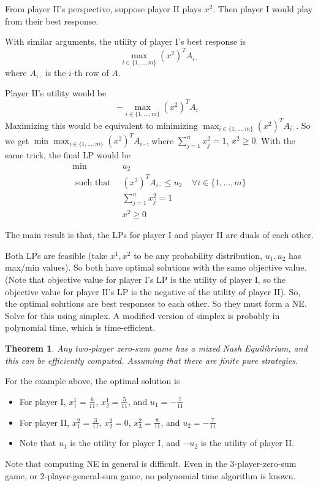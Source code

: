 \documentclass[twoside]{article}
\newcounter{lecnum}
\newtheorem{prototheorem}{Theorem}[lecnum]
\newenvironment{theorem}
{\colorlet{shadecolor}{orange!15}\begin{shaded}\begin{prototheorem}\normalfont}
		{\end{prototheorem}\end{shaded}}
\begin{document}
From player II's perspective, suppose player II plays $x^2$. Then player I would play from their best response. 

With similar arguments, the utility of player I's best response is $$\max_{i \in \{1, ..., m\}} (x^2)^TA_{i\cdot}$$ where $A_{i\cdot }$ is the $i$-th row of $A$. 

Player II's utility would be $$-\max_{i \in \{1, ..., m\}} (x^2)^TA_{i\cdot}$$ Maximizing this would be equivalent to minimizing $\max_{i \in \{1, ..., m\}} (x^2)^TA_{i\cdot}$. So we get $\min \max_{i \in \{1, ..., m\}} (x^2)^TA_{i\cdot}$, where $\sum_{j=1}^{n}x_j^2 = 1$, $x^2 \geq 0$. With the same trick, the final LP would be 
\begin{align*}
	\min              & \;\;u_2                                                             \\
	\text{ such that} & \;\; (x^2)^TA_{i\cdot} \leq u_2 \;\;\;\;\forall i \in \{1, ..., m\} \\
	                  & \;\;\sum_{j=1}^n x_j^2 = 1                                          \\
	                  & \;\;x^2 \geq 0                                                      
\end{align*}

The main result is that, the LPs for player I and player II are duals of each other. 

Both LPs are feasible (take $x^1, x^2$ to be any probability distribution, $u_1, u_2$ has max/min values). So both have optimal solutions with the same objective value. (Note that objective value for player I's LP is the utility of player I, so the objective value for player II's LP is the negative of the utility of player II). So, the optimal solutions are best responses to each other. So they must form a NE. Solve for this using simplex. A modified version of simplex is probably in polynomial time, which is time-efficient.

\begin{theorem}
	Any two-player zero-sum game has a mixed Nash Equilibrium, and this can be efficiently computed. Assuming that there are finite pure strategies. 
\end{theorem}

For the example above, the optimal solution is \begin{itemize}
\item For player I, $x_1^1 = \frac{6}{11}$, $x_2^1 = \frac{5}{11}$, and $u_1 = -\frac{7}{11}$
\item For player II, $x_1^2 = \frac{3}{11}$, $x_2^2 = 0$, $x_3^2 = \frac{8}{11}$, and $u_2 = -\frac{7}{11}$
\item Note that $u_1$ is the utility for player I, and $-u_2$ is the utility of player II. 
\end{itemize}
Note that computing NE in general is difficult. Even in the 3-player-zero-sum game, or 2-player-general-sum game, no polynomial time algorithm is known. 
\end{document}
